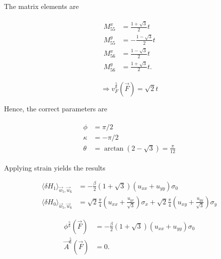 \documentclass[../../../main.tex]{subfiles}
\begin{document}
The matrix elements are 

\begin{align}
	\begin{split}
		M_{55}^x &= \frac{1+\sqrt{3}}{2}t \\
		M_{55}^y &= - \frac{1-\sqrt{3}}{2}t \\
		M_{56}^x &= \frac{1-\sqrt{3}}{2}t \\
		M_{56}^y &= \frac{1+\sqrt{3}}{2}t.
	\end{split}
\end{align}

\begin{equation}
	\Rightarrow v_F^{\frac56}(\vec{F}) = \sqrt{2}t
\end{equation}

Hence, the correct parameters are 

\begin{align}
	\begin{split}
		\phi &= \pi/2 \\
		\kappa &= - \pi/2 \\
		\theta &= \arctan\left(2-\sqrt{3}\right) = \frac{\pi}{12}
	\end{split}
\end{align}

Applying strain yields the results 

\begin{align}
	\langle \delta H_1 \rangle_{\vec{w}_5, \vec{w}_6} &= -\frac{\beta}{2}(1+\sqrt{3})(u_{xx} + u_{yy})\sigma_0 \\
	\langle \delta H_0 \rangle_{\vec{w}_5, \vec{w}_6} &= \sqrt{2}\frac{\pi}{4}\left(u_{xx} + \frac{u_{yx}}{\sqrt{3}}\right)\sigma_x + \sqrt{2}\frac{\pi}{4} \left(u_{xy} + \frac{u_{yy}}{\sqrt{3}}\right)  \sigma_y
\end{align}

\begin{align}
	\phi^{\frac56}(\vec{F}) &= -\frac{\beta}{2}(1+\sqrt{3})(u_{xx}+u_{yy})\sigma_0 \\
	\vec{A}^{\frac56}(\vec{F}) &= 0.
\end{align}
\end{document}
